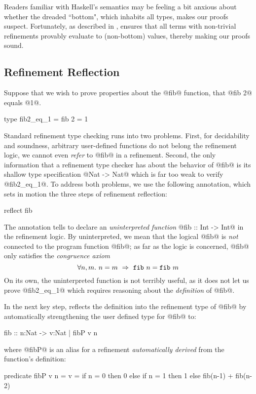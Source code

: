  Readers familiar with Haskell's
semantics may be feeling a bit anxious about whether the
dreaded ``bottom", which inhabits all types, makes our
proofs suspect.
%
Fortunately, as described in \cite{Vazou14}, \toolname
ensures that all terms with non-trivial refinements
provably evaluate to (non-bottom) values, thereby making
our proofs sound.

\subsection{Refinement Reflection}

Suppose that we wish to prove properties about the @fib@
function, \eg that @fib 2@ equals @1@.
%
\begin{code}
  type fib2_eq_1 = { fib 2 = 1 }
\end{code}
%
Standard refinement type checking runs into two problems.
%
First, for decidability and soundness, arbitrary user-defined
functions do not belong the refinement logic, \ie we cannot even
\emph{refer} to @fib@ in a refinement.
%
Second, the only information that a refinement type checker
has about the behavior of @fib@ is its shallow type
specification @Nat -> Nat@ which is far too weak to verify
@fib2_eq_1@.
%
To address both problems, we use the following annotation,
which sets in motion the three steps of refinement reflection:
%
\begin{code}
  reflect fib
\end{code}

%
The annotation tells \toolname to declare an
\emph{uninterpreted function} @fib :: Int -> Int@
in the refinement logic.
%
By uninterpreted, we mean that the logical @fib@
is \emph{not} connected to the program function
@fib@; as far as the logic is concerned, @fib@
only satisfies the \emph{congruence axiom}
%
$$\forall n, m.\ n = m\ \Rightarrow\ \texttt{fib}\ {n} = \texttt{fib}\ {m}$$
%
On its own, the uninterpreted function is not
terribly useful, as it does not let us prove
%
@fib2_eq_1@ which requires reasoning about the
\emph{definition} of @fib@.

%
In the next key step, \toolname reflects the
definition into the refinement type of @fib@
by automatically strengthening the user defined
type for @fib@ to:
%
\begin{code}
  fib :: n:Nat -> {v:Nat | fibP v n}
\end{code}
%
where @fibP@ is an alias for a refinement
\emph{automatically derived} from the
function's definition:
%
\begin{mcode}
  predicate fibP v n =
    v = if n = 0 then 0 else
        if n = 1 then 1 else
        fib(n-1) + fib(n-2)
\end{mcode}

